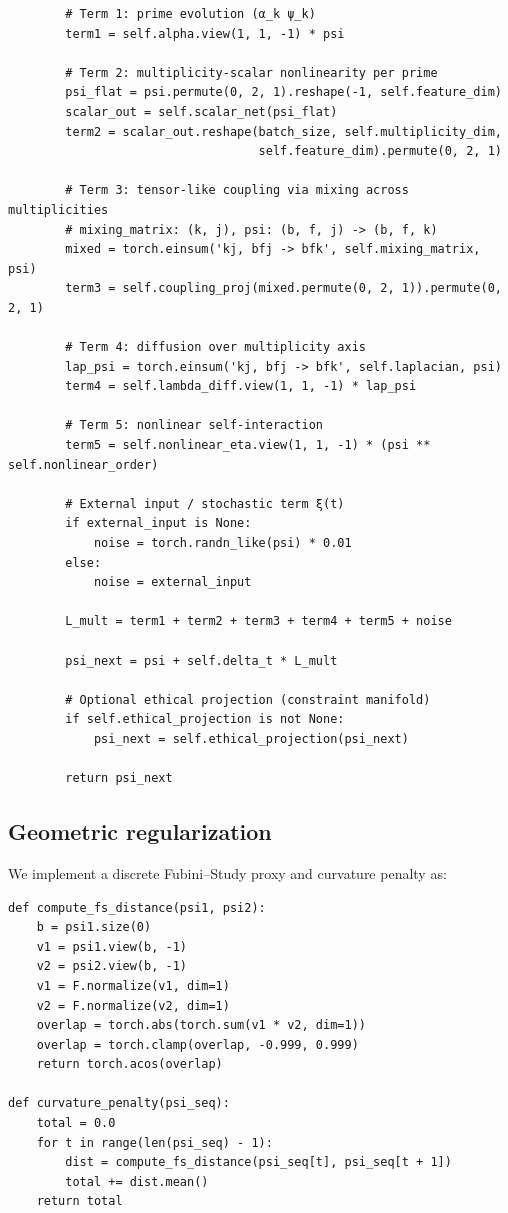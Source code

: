 \documentclass[11pt]{article}
\begin{document}
\begin{verbatim}
        # Term 1: prime evolution (α_k ψ_k)
        term1 = self.alpha.view(1, 1, -1) * psi

        # Term 2: multiplicity-scalar nonlinearity per prime
        psi_flat = psi.permute(0, 2, 1).reshape(-1, self.feature_dim)
        scalar_out = self.scalar_net(psi_flat)
        term2 = scalar_out.reshape(batch_size, self.multiplicity_dim,
                                   self.feature_dim).permute(0, 2, 1)

        # Term 3: tensor-like coupling via mixing across multiplicities
        # mixing_matrix: (k, j), psi: (b, f, j) -> (b, f, k)
        mixed = torch.einsum('kj, bfj -> bfk', self.mixing_matrix, psi)
        term3 = self.coupling_proj(mixed.permute(0, 2, 1)).permute(0, 2, 1)

        # Term 4: diffusion over multiplicity axis
        lap_psi = torch.einsum('kj, bfj -> bfk', self.laplacian, psi)
        term4 = self.lambda_diff.view(1, 1, -1) * lap_psi

        # Term 5: nonlinear self-interaction
        term5 = self.nonlinear_eta.view(1, 1, -1) * (psi ** self.nonlinear_order)

        # External input / stochastic term ξ(t)
        if external_input is None:
            noise = torch.randn_like(psi) * 0.01
        else:
            noise = external_input

        L_mult = term1 + term2 + term3 + term4 + term5 + noise

        psi_next = psi + self.delta_t * L_mult

        # Optional ethical projection (constraint manifold)
        if self.ethical_projection is not None:
            psi_next = self.ethical_projection(psi_next)

        return psi_next
\end{verbatim}

\subsection{Geometric regularization}

We implement a discrete Fubini--Study proxy and curvature penalty as:
\begin{verbatim}
def compute_fs_distance(psi1, psi2):
    b = psi1.size(0)
    v1 = psi1.view(b, -1)
    v2 = psi2.view(b, -1)
    v1 = F.normalize(v1, dim=1)
    v2 = F.normalize(v2, dim=1)
    overlap = torch.abs(torch.sum(v1 * v2, dim=1))
    overlap = torch.clamp(overlap, -0.999, 0.999)
    return torch.acos(overlap)

def curvature_penalty(psi_seq):
    total = 0.0
    for t in range(len(psi_seq) - 1):
        dist = compute_fs_distance(psi_seq[t], psi_seq[t + 1])
        total += dist.mean()
    return total
\end{verbatim}
\end{document}
